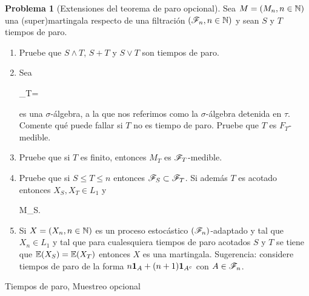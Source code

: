 \documentclass[a5paper,oneside]{amsart}
\theoremstyle{plain}
\theoremstyle{definition}
\newtheorem{problema}{Problema}
\begin{document}
\begin{problema}[Extensiones del teorema de paro opcional]
Sea \(M=\left( M_n,n\in\mathbb{N}\right) \) una (super)martingala respecto de una filtraci\'on \(\left( \mathscr{F}_n,n\in\mathbb{N}\right) \) y sean \(S\) y \(T\) tiempos de paro.
\begin{enumerate}
                \item Pruebe que \(S\wedge T\), \(S+T\) y \(S\vee T\) son tiempos de paro.
                \item Sea \begin{esn}\F_T=\end{esn}es una \(\sigma\)-\'algebra, a la que nos referimos como la \(\sigma\)-\'algebra detenida en \(\tau\). Comente qu\'e puede fallar si \(T\) no es tiempo de paro. Pruebe que \(T\) es \(F_T\)-medible. 
                \item Pruebe que si \(T\) es finito, entonces \(M_T\) es \(\mathscr{F}_T\)-medible.
                \item Pruebe que si \(S\leq T\leq n\) entonces \(\mathscr{F}_S\subset\mathscr{F}_T\). Si adem\'as \(T\) es acotado entonces \(X_S,X_T\in L_1\) y \begin{esn}\leq M_S.\end{esn}
                \item Si \(X=\left( X_n,n\in\mathbb{N}\right) \) es un proceso estoc\'astico \(\left( \mathscr{F}_n\right) \)-adaptado y tal que \(X_n\in L_1\) y tal que para cualesquiera tiempos de paro acotados \(S\) y \(T\) se tiene que \(\mathbb{E}\! \left( X_S \right)=\mathbb{E}\! \left( X_T \right)\) entonces \(X\) es una martingala. Sugerencia: considere tiempos de paro de la forma \(n{\bf{1}}_{A}+(n+1){\bf{1}}_{A^c}\) con \(A\in\mathscr{F}_n\).
\end{enumerate}

Tiempos de paro, Muestreo opcional
\end{problema}


\end{document}
